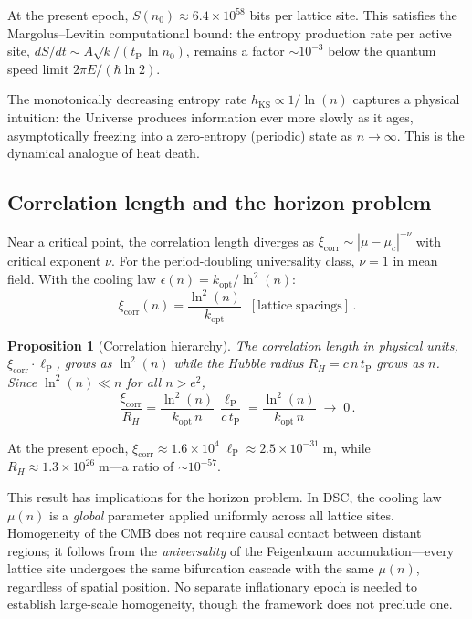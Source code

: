 \documentclass[twocolumn,showpacs,preprintnumbers,amsmath,amssymb,prd]{revtex4-2}
\newtheorem{proposition}{Proposition}
\newcommand{\lnq}{\ln^2}
\newcommand{\tP}{t_{\mathrm{P}}}
\newcommand{\lP}{\ell_{\mathrm{P}}}
\begin{document}
At the present epoch, $S(n_0) \approx 6.4 \times 10^{58}$
bits per lattice site.
This satisfies the Margolus--Levitin computational bound:
the entropy production rate per active site,
$dS/dt \sim A\sqrt{k}/(\tP\,\ln n_0)$,
remains a factor $\sim 10^{-3}$ below the quantum speed limit
$2\pi E/(\hbar\ln 2)$.

The monotonically decreasing entropy rate $h_{\mathrm{KS}} \propto
1/\ln(n)$ captures a physical intuition: the Universe produces
information ever more slowly as it ages, asymptotically freezing
into a zero-entropy (periodic) state as $n \to \infty$.
This is the dynamical analogue of heat death.

\subsection{Correlation length and the horizon problem}
\label{sec:correlation}

Near a critical point, the correlation length diverges as
$\xi_{\mathrm{corr}} \sim |\mu - \mu_c|^{-\nu}$ with critical
exponent $\nu$.
For the period-doubling universality class, $\nu = 1$ in mean
field.
With the cooling law $\epsilon(n) = k_{\mathrm{opt}}/\lnq(n)$:
\begin{equation}
  \xi_{\mathrm{corr}}(n) = \frac{\lnq(n)}{k_{\mathrm{opt}}}
  \;\;\mathrm{[lattice\;spacings]}\,.
  \label{eq:xi_corr}
\end{equation}

\begin{proposition}[Correlation hierarchy]\label{prop:corr}
The correlation length in physical units,
$\xi_{\mathrm{corr}} \cdot \lP$, grows as $\lnq(n)$ while the
Hubble radius $R_H = c\,n\,\tP$ grows as $n$.
Since $\lnq(n) \ll n$ for all $n > e^2$,
\begin{equation}
  \frac{\xi_{\mathrm{corr}}}{R_H}
  = \frac{\lnq(n)}{k_{\mathrm{opt}}\,n}\,\frac{\lP}{c\,\tP}
  = \frac{\lnq(n)}{k_{\mathrm{opt}}\,n}
  \;\to\; 0\,.
  \label{eq:xi_over_RH}
\end{equation}
\end{proposition}

At the present epoch, $\xi_{\mathrm{corr}} \approx
1.6 \times 10^4\;\lP \approx 2.5 \times 10^{-31}\;\mathrm{m}$,
while $R_H \approx 1.3 \times 10^{26}\;\mathrm{m}$---a ratio
of $\sim\!10^{-57}$.

This result has implications for the horizon problem.
In DSC, the cooling law $\mu(n)$ is a \emph{global} parameter
applied uniformly across all lattice sites.
Homogeneity of the CMB does not require causal contact between
distant regions; it follows from the \emph{universality} of
the Feigenbaum accumulation---every lattice site undergoes
the same bifurcation cascade with the same $\mu(n)$, regardless
of spatial position.
No separate inflationary epoch is needed to establish large-scale
homogeneity, though the framework does not preclude one.
\end{document}
